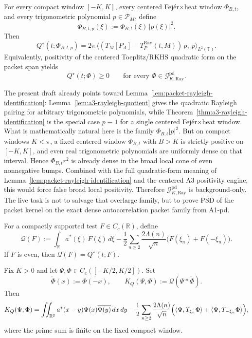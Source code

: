 \begin{lemma}\label{lem:packet-rayleigh-identification}
For every compact window $[-K,K]$, every centered Fej\'er$\times$heat window $\Phi_{B,t}$, and every trigonometric polynomial $p\in\mathcal P_M$, define
\[
  \Phi_{B,t,p}(\xi):=\Phi_{B,t}(\xi)\,|p(\xi)|^2.
\]
Then
\[
  Q^\star(t;\Phi_{B,t,p})
  =
  2\pi\,
  \bigl\langle (T_M[P_A]-T_P^{\mathrm{Ray}}(t,M))\,p,\ p\bigr\rangle_{L^2(\mathbb T)}.
\]
Equivalently, positivity of the centered Toeplitz/RKHS quadratic form on the packet span yields
\[
  Q^\star(t;\Phi)\ge 0\qquad\text{for every }\Phi\in\mathcal G_{K,\mathrm{Ray}}^{\mathrm{pd}}.
\]
\end{lemma}

\begin{remark}
The present draft already points toward Lemma~\ref{lem:packet-rayleigh-identification}:
Lemma~\ref{lem:a3-rayleigh-quotient} gives the quadratic Rayleigh pairing for arbitrary
trigonometric polynomials, while Theorem~\ref{thm:a3-rayleigh-identification} is the
special case $p\equiv1$ for a single centered Fej\'er$\times$heat window. What is
mathematically natural here is the family $\Phi_{B,t}|p|^2$. But on compact windows
$K<\pi$, a fixed centered window $\Phi_{B,t}$ with $B>K$ is strictly positive on
$[-K,K]$, and even real trigonometric polynomials are uniformly dense on that
interval. Hence $\Phi_{B,t}r^2$ is already dense in the broad local cone of even
nonnegative bumps. Combined with the full quadratic-form meaning of
Lemma~\ref{lem:packet-rayleigh-identification} and the centered A3 positivity
engine, this would force false broad local positivity. Therefore
$\mathcal G_{K,\mathrm{Ray}}^{\mathrm{pd}}$ is background-only. The live task is not
to salvage that overlarge family, but to prove PSD of the packet kernel on the
exact dense autocorrelation packet family from A1-pd.
\end{remark}

\begin{definition}\label{def:Q-symmetric-extension}
For a compactly supported test $F\in C_c(\mathbb R)$, define
\[
  \mathcal Q(F)
  :=
  \int_{\mathbb R} a^*(\xi)\,F(\xi)\,d\xi
  -
  \frac12\sum_{n\ge2}\frac{2\Lambda(n)}{\sqrt n}\bigl(F(\xi_n)+F(-\xi_n)\bigr).
\]
If $F$ is even, then $\mathcal Q(F)=Q^\star(t;F)$.
\end{definition}

\begin{lemma}\label{lem:packet-sesquilinear}
Fix $K>0$ and let $\Psi,\Phi\in C_c([-K/2,K/2])$. Set
\[
  \widetilde{\Phi}(x):=\overline{\Phi(-x)},
  \qquad
  K_Q(\Psi,\Phi):=\mathcal Q(\Psi * \widetilde{\Phi}).
\]
Then
\[
  K_Q(\Psi,\Phi)
  =
  \iint_{\mathbb R^2} a^*(x-y)\Psi(x)\overline{\Phi(y)}\,dx\,dy
  -
  \frac12\sum_{n\ge2}\frac{2\Lambda(n)}{\sqrt n}
  \Bigl(
    \langle \Psi,T_{\xi_n}\Phi\rangle
    +
    \langle \Psi,T_{-\xi_n}\Phi\rangle
  \Bigr),
\]
where the prime sum is finite on the fixed compact window.
\end{lemma}

